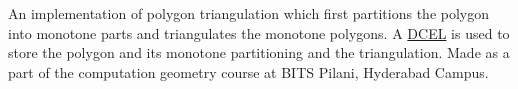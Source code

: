 \label{index_md_src_Readme}%
%
An implementation of polygon triangulation which first partitions the polygon into monotone parts and triangulates the monotone polygons. A \mbox{\hyperlink{class_d_c_e_l}{D\+C\+EL}} is used to store the polygon and its monotone partitioning and the triangulation. Made as a part of the computation geometry course at B\+I\+TS Pilani, Hyderabad Campus. 